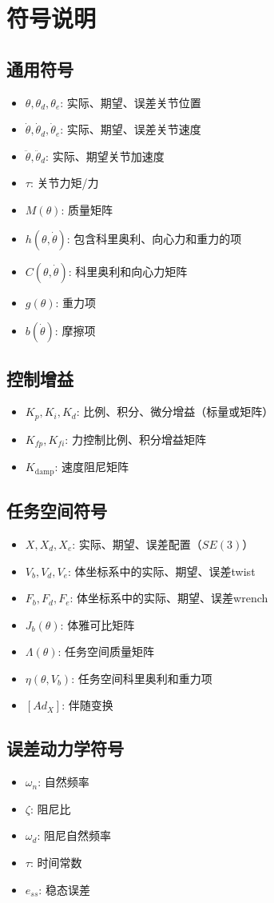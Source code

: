 \documentclass[12pt,a4paper]{article}
\begin{document}
\section{符号说明}

\subsection{通用符号}

\begin{itemize}
\item $\theta, \theta_d, \theta_e$: 实际、期望、误差关节位置
\item $\dot{\theta}, \dot{\theta}_d, \dot{\theta}_e$: 实际、期望、误差关节速度
\item $\ddot{\theta}, \ddot{\theta}_d$: 实际、期望关节加速度
\item $\tau$: 关节力矩/力
\item $M(\theta)$: 质量矩阵
\item $h(\theta, \dot{\theta})$: 包含科里奥利、向心力和重力的项
\item $C(\theta, \dot{\theta})$: 科里奥利和向心力矩阵
\item $g(\theta)$: 重力项
\item $b(\dot{\theta})$: 摩擦项
\end{itemize}

\subsection{控制增益}

\begin{itemize}
\item $K_p, K_i, K_d$: 比例、积分、微分增益（标量或矩阵）
\item $K_{fp}, K_{fi}$: 力控制比例、积分增益矩阵
\item $K_{\text{damp}}$: 速度阻尼矩阵
\end{itemize}

\subsection{任务空间符号}

\begin{itemize}
\item $X, X_d, X_e$: 实际、期望、误差配置（$SE(3)$）
\item $V_b, V_d, V_e$: 体坐标系中的实际、期望、误差twist
\item $F_b, F_d, F_e$: 体坐标系中的实际、期望、误差wrench
\item $J_b(\theta)$: 体雅可比矩阵
\item $\Lambda(\theta)$: 任务空间质量矩阵
\item $\eta(\theta, V_b)$: 任务空间科里奥利和重力项
\item $[Ad_X]$: 伴随变换
\end{itemize}

\subsection{误差动力学符号}

\begin{itemize}
\item $\omega_n$: 自然频率
\item $\zeta$: 阻尼比
\item $\omega_d$: 阻尼自然频率
\item $\tau$: 时间常数
\item $e_{ss}$: 稳态误差
\end{itemize}
\end{document}
